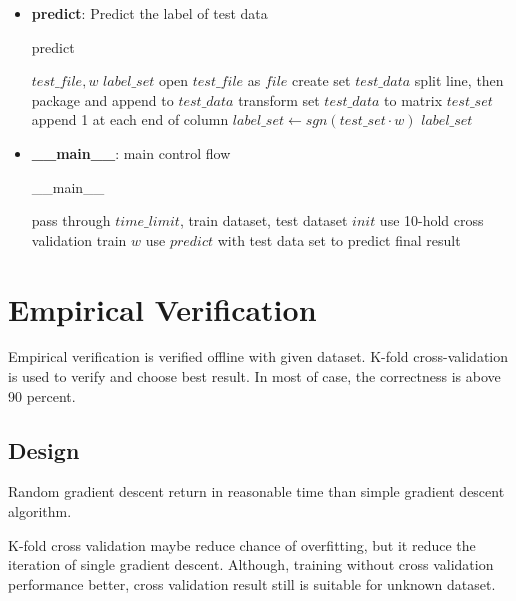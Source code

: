 \documentclass[conference,compsoc]{IEEEtran}
\renewcommand{\algorithmicrequire}{\textbf{Input:}}
\renewcommand{\algorithmicensure}{\textbf{Output:}}
\begin{document}
\begin{itemize}
 \item \textbf{predict}: Predict the label of test data
     \begin{algorithm}[H]
     \caption{predict}
     \begin{algorithmic}[4]
     \renewcommand{\algorithmicrequire}{\textbf{Input:}}
     \renewcommand{\algorithmicensure}{\textbf{Output:}}
     \REQUIRE $test\_file, w$
     \ENSURE  $label\_set$
     \STATE open $test\_file$ as $file$
     \STATE create set $test\_data$
          \STATE split line, then package and append to $test\_data$
     \ENDFOR
     \STATE transform set $test\_data$ to matrix $test\_set$
     \STATE append 1 at each end of column
     \STATE $label\_set \leftarrow  sgn(test\_set\cdot{w})$
     \RETURN $label\_set$
     \end{algorithmic}
     \end{algorithm}
 
 \item \textbf{\_\_main\_\_}: main control flow
	 \begin{algorithm}[H]
	\caption{\_\_main\_\_}
	\begin{algorithmic}[5]
 	\renewcommand{\algorithmicrequire}{\textbf{Input:}}
        \renewcommand{\algorithmicensure}{\textbf{Output:}}
	\REQUIRE 
	\ENSURE
	\STATE pass through $time\_limit$, train dataset, test dataset
	\STATE $init$
	\STATE use 10-hold cross validation train $w$
	\STATE use $predict$ with test data set to predict final result
	\end{algorithmic}
        \end{algorithm}
 	
\end{itemize}


\section{Empirical Verification}
Empirical verification is verified offline with given dataset. K-fold
cross-validation is used to verify and choose best result. In most of
case, the correctness is above 90 percent.

\subsection{Design}

Random gradient descent return in reasonable time than simple gradient
descent algorithm.

K-fold cross validation maybe reduce chance of overfitting, but it reduce
the iteration of single gradient descent. Although, training without cross
validation performance better, cross validation result still is suitable
for unknown dataset.
\end{document}
